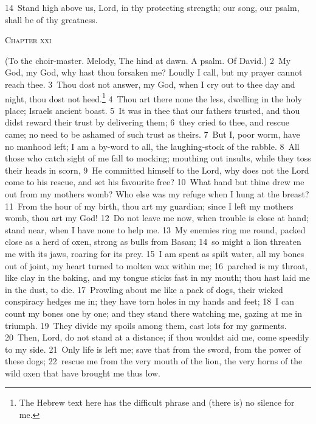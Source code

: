 \documentclass[10pt]{book} %
\begin{document}
\textcolor{benred8}{14}~Stand high above us, Lord, in thy protecting strength; our song, our psalm, shall be of thy greatness.
\begin{large}\begin{center}\textsc{Chapter xxi}\end{center}\end{large}
(To the choir-master. Melody, The hind at dawn. A psalm. Of David.)
\textcolor{benred8}{2}~My God, my God, why hast thou forsaken me? Loudly I call, but my prayer cannot reach thee. \textcolor{benred8}{3}~Thou dost not answer, my God, when I cry out to thee day and night, thou dost not heed.\footnote[1]{The Hebrew text here has the difficult phrase \textasciigrave and (there is) no silence for me\textquotesingle .} \textcolor{benred8}{4}~Thou art there none the less, dwelling in the holy place; Israel\textquotesingle s ancient boast. \textcolor{benred8}{5}~It was in thee that our fathers trusted, and thou didst reward their trust by delivering them; \textcolor{benred8}{6}~they cried to thee, and rescue came; no need to be ashamed of such trust as theirs. \textcolor{benred8}{7}~But I, poor worm, have no manhood left; I am a by-word to all, the laughing-stock of the rabble. \textcolor{benred8}{8}~All those who catch sight of me fall to mocking; mouthing out insults, while they toss their heads in scorn, \textcolor{benred8}{9}~He committed himself to the Lord, why does not the Lord come to his rescue, and set his favourite free?
\textcolor{benred8}{10}~What hand but thine drew me out from my mother\textquotesingle s womb? Who else was my refuge when I hung at the breast? \textcolor{benred8}{11}~From the hour of my birth, thou art my guardian; since I left my mother\textquotesingle s womb, thou art my God! \textcolor{benred8}{12}~Do not leave me now, when trouble is close at hand; stand near, when I have none to help me. \textcolor{benred8}{13}~My enemies ring me round, packed close as a herd of oxen, strong as bulls from Basan; \textcolor{benred8}{14}~so might a lion threaten me with its jaws, roaring for its prey. \textcolor{benred8}{15}~I am spent as spilt water, all my bones out of joint, my heart turned to molten wax within me; \textcolor{benred8}{16}~parched is my throat, like clay in the baking, and my tongue sticks fast in my mouth; thou hast laid me in the dust, to die. \textcolor{benred8}{17}~Prowling about me like a pack of dogs, their wicked conspiracy hedges me in; they have torn holes in my hands and feet; \textcolor{benred8}{18}~I can count my bones one by one; and they stand there watching me, gazing at me in triumph. \textcolor{benred8}{19}~They divide my spoils among them, cast lots for my garments. \textcolor{benred8}{20}~Then, Lord, do not stand at a distance; if thou wouldst aid me, come speedily to my side. \textcolor{benred8}{21}~Only life is left me; save that from the sword, from the power of these dogs; \textcolor{benred8}{22}~rescue me from the very mouth of the lion, the very horns of the wild oxen that have brought me thus low.
\end{document}

